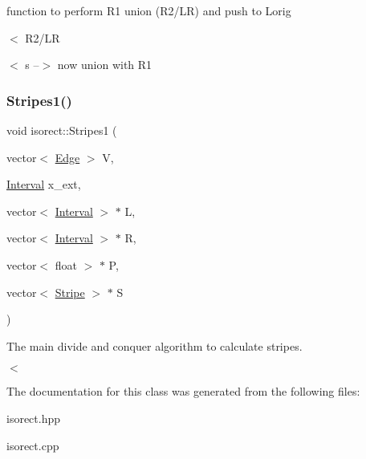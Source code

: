 function to perform R1 union (R2/\+LR) and push to Lorig 

$<$ R2/\+LR

$<$ s --$>$ now union with R1 \mbox{\label{classisorect_a74025c4207a4fe68b7a3e8be79d8c1cc}} 
\subsubsection{\texorpdfstring{Stripes1()}{Stripes1()}}
{\footnotesize\ttfamily void isorect\+::\+Stripes1 (\begin{DoxyParamCaption}\item[{vector$<$ \hyperlink{classEdge}{Edge} $>$}]{V,  }\item[{\hyperlink{classInterval}{Interval}}]{x\+\_\+ext,  }\item[{vector$<$ \hyperlink{classInterval}{Interval} $>$ $\ast$}]{L,  }\item[{vector$<$ \hyperlink{classInterval}{Interval} $>$ $\ast$}]{R,  }\item[{vector$<$ float $>$ $\ast$}]{P,  }\item[{vector$<$ \hyperlink{classStripe}{Stripe} $>$ $\ast$}]{S }\end{DoxyParamCaption})}



The main divide and conquer algorithm to calculate stripes. 

$<$ 

The documentation for this class was generated from the following files\+:\begin{DoxyCompactItemize}
\item 
isorect.\+hpp\item 
isorect.\+cpp\end{DoxyCompactItemize}
